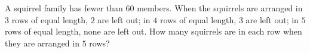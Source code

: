 A squirrel family has fewer than $60$ members. When the squirrels are arranged in $3$ rows of equal length, $2$ are left out; in $4$ rows of equal length, $3$ are left out; in $5$ rows of equal length, none are left out. How many squirrels are in each row when they are arranged in $5$ rows?
